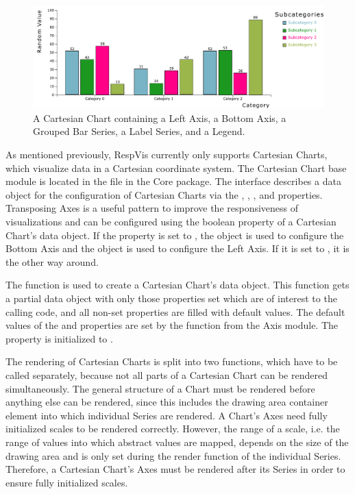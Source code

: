 \begin{figure}[tp]
\centering
\includegraphics[keepaspectratio,width=\linewidth,height=\fullh]
{diagrams/chart.pdf}
\caption[Cartesian Chart Example]{%
A Cartesian Chart containing a Left Axis, a Bottom Axis,
a Grouped Bar Series, a Label Series, and a Legend.
}
\label{fig:Chart}
\end{figure}


As mentioned previously, RespVis currently only supports Cartesian
Charts, which visualize data in a Cartesian coordinate system. The
Cartesian Chart base module is located in the
 file in the Core package. The
 interface describes a data object for the
configuration of Cartesian Charts via the , ,
, and  properties. Transposing Axes is a
useful pattern to improve the responsiveness of visualizations and can
be configured using the  boolean property of a Cartesian
Chart's data object. If the  property is set to
, the  object is used to configure the Bottom
Axis and the  object is used to configure the Left Axis.
If it is set to , it is the other way around.

The  function is used to create a
Cartesian Chart's data object. This function gets a partial data
object with only those properties set which are of interest to the
calling code, and all non-set properties are filled with default
values. The default values of the  and 
properties are set by the  function from the Axis
module. The  property is initialized to .

The rendering of Cartesian Charts is split into two functions, which
have to be called separately, because not all parts of a Cartesian
Chart can be rendered simultaneously. The general structure of a Chart
must be rendered before anything else can be rendered, since this
includes the drawing area container element into which individual Series
are rendered. A Chart's Axes need fully initialized scales to be
rendered correctly. However, the range of a scale, i.e. the range of
values into which abstract values are mapped, depends on the size of
the drawing area and is only set during the render function of the
individual Series. Therefore, a Cartesian Chart's Axes must be
rendered after its Series in order to ensure fully initialized scales.

